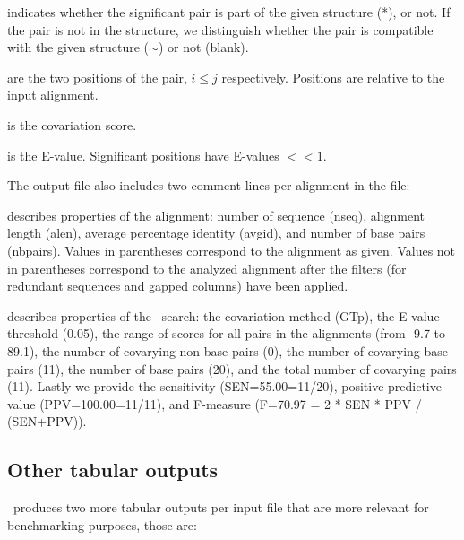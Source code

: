 \begin{sreitems}{}
 \item[\prog{First column}] indicates whether the significant pair is
   part of the given structure (*), or not.  If the pair is not in the
   structure, we distinguish whether the pair is compatible with the
   given structure ($\sim$) or not (blank).

 \item[\prog{Second and third columns}] are the two positions of the
   pair, $i\leq j$ respectively. Positions are relative to the input
   alignment.

 \item[\prog{Fourth column}] is the covariation score.

 \item[\prog{Fifth column}] is the E-value. Significant positions
   have E-values $<< 1$.
 \end{sreitems}
 The output file also includes two comment lines per alignment in the
 file:

 \begin{sreitems}{} \item[\prog{First
 comment line}]describes properties of the alignment: number of
 sequence (nseq), alignment length (alen), average percentage identity
 (avgid), and number of base pairs (nbpairs).  Values in parentheses
 correspond to the alignment as given. Values not in parentheses
 correspond to the analyzed alignment after the filters (for redundant
 sequences and gapped columns) have been applied.

 \item[\prog{Second comment line}]describes properties of the \rscape\
   search: the covariation method (GTp), the E-value threshold (0.05),
   the range of scores for all pairs in the alignments (from -9.7 to
   89.1), the number of covarying non base pairs (0), the number of
   covarying base pairs (11), the number of base pairs (20), and the
   total number of covarying pairs (11). Lastly we provide the
   sensitivity (SEN=55.00=11/20), positive predictive value
   (PPV=100.00=11/11), and F-measure (F=70.97 = 2 * SEN * PPV /
   (SEN+PPV)).  \end{sreitems}


\subsection{Other tabular outputs}

 \rscape\ produces two more tabular outputs per input file that are
 more relevant for benchmarking purposes, those are:\\

